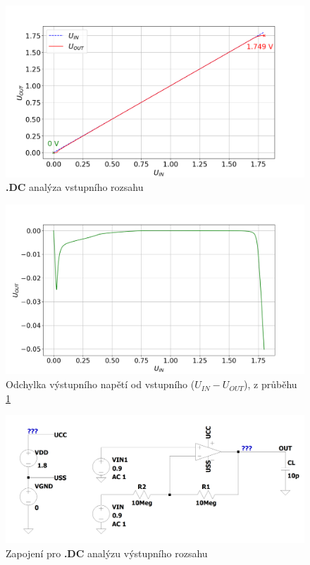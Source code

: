 \begin{figure}[h!]
    \centering
    \includegraphics[width=\textwidth]{text/img/DC-charakteristika.png}
    \caption{\label{fig:res-DC-char} {\bf .DC} analýza vstupního rozsahu}
\end{figure}

\begin{figure}[h!]
    \centering
    \includegraphics[width=\textwidth]{text/img/DC-korekcni.png}
    \caption{\label{fig:res-DC-korekcni} Odchylka výstupního napětí od vstupního (\(U_{IN} - U_{OUT}\)), z průběhu \ref{fig:res-DC-char}}
\end{figure}


\begin{figure}[h!]
    \centering
    \includegraphics[width=\textwidth]{text/img/DC2-sch.png}
    \caption{\label{fig:res-DC2-sch} Zapojení pro {\bf .DC} analýzu výstupního rozsahu}
\end{figure}

